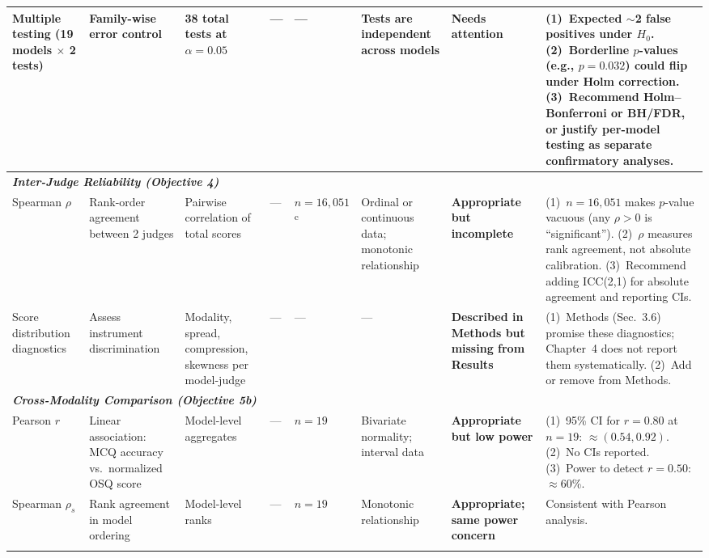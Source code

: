 \begin{table}[htbp]
{\begin{tabular}{p{2.0cm} p{2.2cm} p{2.2cm} p{1.5cm} p{1.5cm} p{2.0cm} p{3.0cm} p{3.0cm}}
Multiple testing (19 models $\times$ 2 tests) &
Family-wise error control &
38 total tests at $\alpha = 0.05$ &
--- &
--- &
Tests are independent across models &
\textbf{Needs attention} &
(1)~Expected $\sim$2 false positives under $H_0$. (2)~Borderline $p$-values (e.g., $p{=}0.032$) could flip under Holm correction. (3)~Recommend Holm--Bonferroni or BH/FDR, or justify per-model testing as separate confirmatory analyses. \\

\midrule

\multicolumn{8}{l}{\textit{\textbf{Inter-Judge Reliability (Objective 4)}}} \\
\addlinespace[0.3em]

Spearman $\rho$ &
Rank-order agreement between 2 judges &
Pairwise correlation of total scores &
--- &
$n{=}16{,}051$\textsuperscript{c} &
Ordinal or continuous data; monotonic relationship &
\textbf{Appropriate but incomplete} &
(1)~$n{=}16{,}051$ makes $p$-value vacuous (any $\rho > 0$ is ``significant''). (2)~$\rho$ measures rank agreement, not absolute calibration. (3)~Recommend adding ICC(2,1) for absolute agreement and reporting CIs. \\
\addlinespace

Score distribution diagnostics &
Assess instrument discrimination &
Modality, spread, compression, skewness per model-judge &
--- &
--- &
--- &
\textbf{Described in Methods but missing from Results} &
(1)~Methods (Sec.~3.6) promise these diagnostics; Chapter~4 does not report them systematically. (2)~Add or remove from Methods. \\

\midrule

\multicolumn{8}{l}{\textit{\textbf{Cross-Modality Comparison (Objective 5b)}}} \\
\addlinespace[0.3em]

Pearson $r$ &
Linear association: MCQ accuracy vs.\ normalized OSQ score &
Model-level aggregates &
--- &
$n{=}19$ &
Bivariate normality; interval data &
\textbf{Appropriate but low power} &
(1)~95\% CI for $r{=}0.80$ at $n{=}19$: $\approx (0.54, 0.92)$. (2)~No CIs reported. (3)~Power to detect $r{=}0.50$: $\approx$60\%. \\
\addlinespace

Spearman $\rho_s$ &
Rank agreement in model ordering &
Model-level ranks &
--- &
$n{=}19$ &
Monotonic relationship &
\textbf{Appropriate; same power concern} &
Consistent with Pearson analysis. \\
\addlinespace


\end{tabular}}
\end{table}
